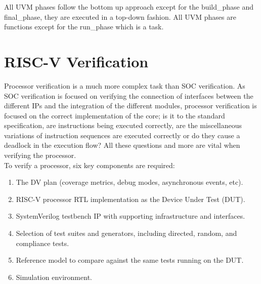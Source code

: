 \documentclass[../main.tex]{subfiles}
\begin{document}
 \noindent All UVM phases follow the bottom up approach except for the build\_phase and final\_phase, they are executed in a top-down fashion.\newline
 All UVM phases are functions except for the run\_phase which is a task.
 
\section{RISC-V Verification}
Processor verification is a much more complex task than SOC verification. As SOC verification is focused on verifying the connection of interfaces between the different IPs and the integration of the different modules, processor verification is focused on the correct implementation of the core; is it to the standard specification, are instructions being executed correctly, are the miscellaneous variations of instruction sequences are executed correctly or do they cause a deadlock in the execution flow? All these questions and more are vital when verifying the processor.\\
\newline
To verify a processor, six key components are required:\cite{StepCompare}  
\begin{enumerate}
\item The DV plan (coverage metrics, debug modes, asynchronous events, etc).
\item RISC-V processor RTL implementation as the Device Under Test (DUT).
\item SystemVerilog testbench IP with supporting infrastructure and interfaces.
\item Selection of test suites and generators, including directed, random, and compliance tests.
\item Reference model to compare against the same tests running on the DUT.
\item Simulation environment.
\end{enumerate}
\end{document}
